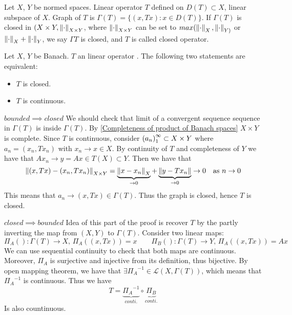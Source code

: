 \begin{definition}\label{Closed Operator}\nl
	Let $X$, $Y$ be normed spaces. Linear operator $T$ defined on $D(T)\subset X$, linear subspace of $X$. Graph of $T$ is $\Gamma (T)=\{(x,Tx):x\in D(T)\}$. If $\Gamma (T)$ is closed in $(X\times Y,\left\|{\cdot}\right\|_{X\times Y}$, where $\left\|{\cdot}\right\|_{X\times Y}$ can be set to $max(\left\|{\cdot}\right\|_{X},\left\|{\cdot}\right\|_{Y)}$ or $\left\|{\cdot}\right\|_{X}+\left\|{\cdot}\right\|_{Y}$, we say $\Gamma T$ is closed, and $T$ is called closed operator.
\end{definition}





\begin{theorem}\label{CGT}\nl
	Let $X$, $Y$ be Banach. $T$ an linear operator . The following two statements are equivalent:
	\begin{itemize}
		\item $T$ is closed.
		\item $T$ is continuous.
	\end{itemize}
	\begin{pf}{$bounded\implies closed$}{}
		We should check that limit of a convergent sequence sequence in $\Gamma(T)$ is inside $\Gamma(T)$.
		By
		\ref{Completeness of product of Banach spaces} 
		$X\times Y$ is complete.
		Since $T$ is continuous, consider $\left({a_n}\right)_1^\infty\subset X\times Y$ where $a_n=(x_n,Tx_n)$ with $x_n\to x\in X$. By continuity of $T$ and completeness of $Y$ we have that $Ax_n\to y=Ax\in T(X)\subset Y$. Then we have that
		$$\left\|{(x,Tx)-(x_n,Tx_n)}\right\|_{X \times Y}=\underbrace{\left\|{x-x_n}\right\|_{X}}_{\to 0}+\underbrace{\left\|{y-Tx_n}\right\|}_{\to 0}\to0\quad \text{as  }n\to0$$
		This means that $a_n\to(x,Tx)\in \Gamma(T)$. Thus the graph is closed, hence $T$ is closed.
	\end{pf}
	\begin{pf}{$closed\implies bounded$}{}
		Idea of this part of the proof is recover $T$ by the partly inverting the map from $(X,Y)$ to $\Gamma(T)$.
		Consider two linear maps:
		$$
			\Pi_A():\Gamma(T)\to X,\,\Pi_A((x,Tx))=x\qquad \Pi_B():\Gamma(T)\to Y,\,\Pi_A((x,Tx))=Ax
		$$
		We can use sequential continuity to check that both maps are continuous. Moreover, $\Pi_A$ is  surjective and injective from its definition, thus bijective. By open mapping theorem, we have that $\exists {\Pi_A}^{-1}\in\mathcal{L}(X,\Gamma(T))$, which means that ${\Pi_A}^{-1}$ is continuous. Thus we have
		$$
			T=\underbrace{{\Pi_A}^{-1}}_{conti.}\circ\underbrace{{\Pi_B}}_{conti.}
		$$
		Is also countinuous.
	\end{pf}
\end{theorem}

\begin{example}\nl
	\placeholder
\end{example}


\begin{example}\nl
	\placeholder
\end{example}